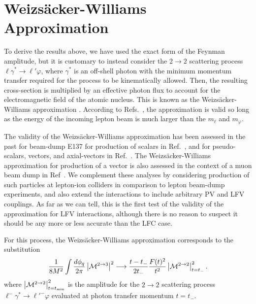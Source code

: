 \section{Weizs\"acker-Williams Approximation}\label{sec:WW}
To derive the results above, we have used the exact form of the Feynman amplitude, but it is customary to instead consider the $2\rightarrow 2$ scattering process $\ell\gamma^* \rightarrow \ell'\varphi$, where $\gamma^*$ is an off-shell photon with the minimum momentum transfer required for the process to be kinematically allowed. Then, the resulting cross-section is multiplied by an effective photon flux to account for the electromagnetic field of the atomic nucleus. This is known as the Weizs\"acker-Williams approximation \cite{vonWeizsacker:1934nji,Williams:1935dka}. According to Refs.~\cite{Kim:1973he,Tsai:1973py}, the approximation is valid so long as the energy of the incoming lepton beam is much larger than the $m_\ell$ and $m_\varphi$.

The validity of the Weizs\"acker-Williams approximation has been assessed in the past for beam-dump E137 for production of scalars in Ref.~\cite{Liu:2016mqv}, and for pseudo-scalars, vectors, and axial-vectors in Ref.~\cite{Liu:2017htz}. The Weizs\"acker-Williams approximation for production of a vector is also assessed in the context of a muon beam dump in Ref~\cite{Chen:2017awl}. We complement these analyses by considering production of such particles at lepton-ion colliders in comparison to lepton beam-dump experiments, and also extend the interactions to include arbitrary PV and LFV couplings. As far as we can tell, this is the first test of the validity of the approximation for LFV interactions, although there is no reason to suspect it should be any more or less accurate than the LFC case.

For this process, the Weizs\"acker-Williams approximation corresponds to the substitution \cite{Kim:1973he}
\begin{align}
    \frac{1}{8M^2}\int{\frac{d\phi_q}{2\pi} \left|{\cal M}^{2\rightarrow 3}\right|^2} \longrightarrow \frac{t - t_{-}}{2t_-}\frac{F(t)^2}{t^2}\left|{\cal M}^{2\rightarrow 2}\right|_{t=t_{-}}^2.\label{eq:WW_sub}
\end{align}
where $\left|{\cal M}^{2\rightarrow 2}\right|_{t=t_{\rm min}}^2$ is the amplitude for the $2 \rightarrow 2$ scattering process $\ell^-\gamma^* \rightarrow \ell'^- \varphi$ evaluated at photon transfer momentum $t = t_-$. 

